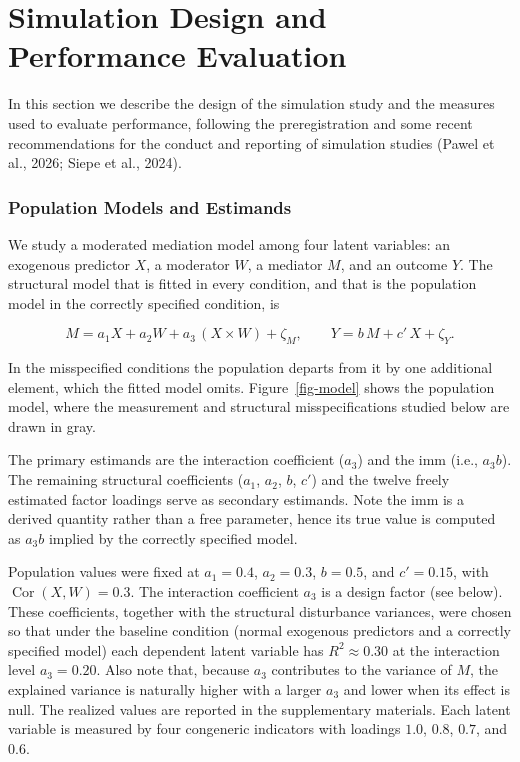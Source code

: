 \documentclass[
  man,
  longtable,
  nolmodern,
  notxfonts,
  notimes,
  colorlinks=true,linkcolor=blue,citecolor=blue,urlcolor=blue]{apa7}
\begin{document}
\section{Simulation Design and Performance
Evaluation}\label{simulation-design-and-performance-evaluation}

In this section we describe the design of the simulation study and the
measures used to evaluate performance, following the preregistration and
some recent recommendations for the conduct and reporting of simulation
studies (Pawel et al., 2026; Siepe et al., 2024).

\subsubsection{Population Models and
Estimands}\label{population-models-and-estimands}

We study a moderated mediation model among four latent variables: an
exogenous predictor \(X\), a moderator \(W\), a mediator \(M\), and an
outcome \(Y\). The structural model that is fitted in every condition,
and that is the population model in the correctly specified condition,
is

\[
M = a_1 X + a_2 W + a_3\,(X \times W) + \zeta_M, \qquad
Y = b\,M + c'\,X + \zeta_Y.
\]

\noindent In the misspecified conditions the population departs from it
by one additional element, which the fitted model omits.
Figure~\ref{fig-model} shows the population model, where the measurement
and structural misspecifications studied below are drawn in gray.

The primary estimands are the interaction coefficient (\(a_3\)) and the
imm (i.e., \(a_3 b\)). The remaining structural coefficients (\(a_1\),
\(a_2\), \(b\), \(c'\)) and the twelve freely estimated factor loadings
serve as secondary estimands. Note the imm is a derived quantity rather
than a free parameter, hence its true value is computed as \(a_3 b\)
implied by the correctly specified model.

Population values were fixed at \(a_1 = 0.4\), \(a_2 = 0.3\),
\(b = 0.5\), and \(c' = 0.15\), with \(\operatorname{Cor}(X, W) = 0.3\).
The interaction coefficient \(a_3\) is a design factor (see below).
These coefficients, together with the structural disturbance variances,
were chosen so that under the baseline condition (normal exogenous
predictors and a correctly specified model) each dependent latent
variable has \(R^2 \approx 0.30\) at the interaction level
\(a_3 = 0.20\). Also note that, because \(a_3\) contributes to the
variance of \(M\), the explained variance is naturally higher with a
larger \(a_3\) and lower when its effect is null. The realized values
are reported in the supplementary materials. Each latent variable is
measured by four congeneric indicators with loadings \(1.0\), \(0.8\),
\(0.7\), and \(0.6\).
\end{document}

